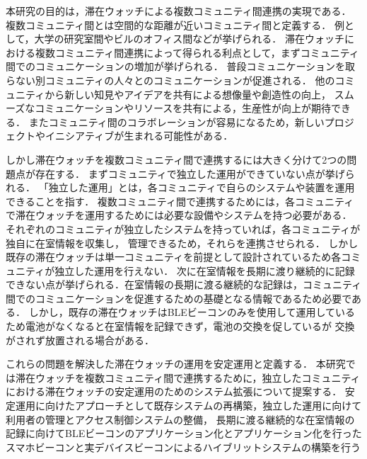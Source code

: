 本研究の目的は，滞在ウォッチによる複数コミュニティ間連携の実現である．
複数コミュニティ間とは空間的な距離が近いコミュニティ間と定義する．
例として，大学の研究室間やビルのオフィス間などが挙げられる．
滞在ウォッチにおける複数コミュニティ間連携によって得られる利点として，まずコミュニティ間でのコミュニケーションの増加が挙げられる．
普段コミュニケーションを取らない別コミュニティの人々とのコミュニケーションが促進される．
他のコミュニティから新しい知見やアイデアを共有による想像量や創造性の向上，
スムーズなコミュニケーションやリソースを共有による，生産性が向上が期待できる．
またコミュニティ間のコラボレーションが容易になるため，新しいプロジェクトやイニシアティブが生まれる可能性がある．

しかし滞在ウォッチを複数コミュニティ間で連携するには大きく分けて2つの問題点が存在する．
まずコミュニティで独立した運用ができていない点が挙げられる．
「独立した運用」とは，各コミュニティで自らのシステムや装置を運用できることを指す．
複数コミュニティ間で連携するためには，各コミュニティで滞在ウォッチを運用するためには必要な設備やシステムを持つ必要がある．
それぞれのコミュニティが独立したシステムを持っていれば，各コミュニティが独自に在室情報を収集し，
管理できるため，それらを連携させられる．
しかし既存の滞在ウォッチは単一コミュニティを前提として設計されているため各コミュニティが独立した運用を行えない．
次に在室情報を長期に渡り継続的に記録できない点が挙げられる．在室情報の長期に渡る継続的な記録は，コミュニティ間でのコミュニケーションを促進するための基礎となる情報であるため必要である．
しかし，既存の滞在ウォッチはBLEビーコンのみを使用して運用しているため電池がなくなると在室情報を記録できず，電池の交換を促しているが
交換がされず放置される場合がある．

これらの問題を解決した滞在ウォッチの運用を安定運用と定義する．
本研究では滞在ウォッチを複数コミュニティ間で連携するために，独立したコミュニティにおける滞在ウォッチの安定運用のためのシステム拡張について提案する．
安定運用に向けたアプローチとして既存システムの再構築，独立した運用に向けて利用者の管理とアクセス制御システムの整備，
長期に渡る継続的な在室情報の記録に向けてBLEビーコンのアプリケーション化とアプリケーション化を行ったスマホビーコンと実デバイスビーコンによるハイブリットシステムの構築を行う





